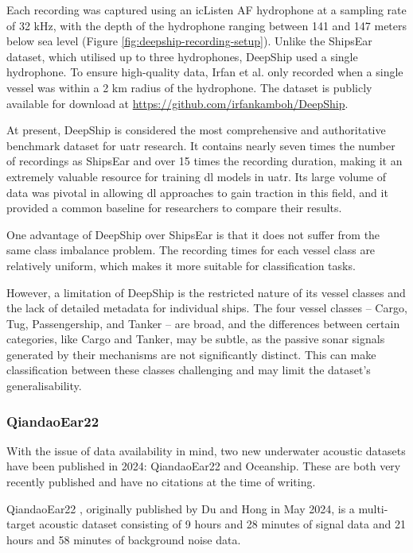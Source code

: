 Each recording was captured using an icListen AF hydrophone at a sampling rate of 32 kHz, with the depth of the hydrophone ranging between 141 and 147 meters below sea level (Figure \ref{fig:deepship-recording-setup}). Unlike the ShipsEar dataset, which utilised up to three hydrophones, DeepShip used a single hydrophone. To ensure high-quality data, Irfan et al. only recorded when a single vessel was within a 2 km radius of the hydrophone. The dataset is publicly available for download at \url{https://github.com/irfankamboh/DeepShip}.

At present, DeepShip is considered the most comprehensive and authoritative benchmark dataset for \acrshort{uatr} research. It contains nearly seven times the number of recordings as ShipsEar and over 15 times the recording duration, making it an extremely valuable resource for training \acrlong{dl} models in \acrshort{uatr}. Its large volume of data was pivotal in allowing \acrlong{dl} approaches to gain traction in this field, and it provided a common baseline for researchers to compare their results.

One advantage of DeepShip over ShipsEar is that it does not suffer from the same class imbalance problem. The recording times for each vessel class are relatively uniform, which makes it more suitable for classification tasks.

However, a limitation of DeepShip is the restricted nature of its vessel classes and the lack of detailed metadata for individual ships. The four vessel classes -- Cargo, Tug, Passengership, and Tanker -- are broad, and the differences between certain categories, like Cargo and Tanker, may be subtle, as the passive sonar signals generated by their mechanisms are not significantly distinct. This can make classification between these classes challenging and may limit the dataset's generalisability.

\subsubsection{QiandaoEar22}\label{subsubsec:qiandaoear22}

With the issue of data availability in mind, two new underwater acoustic datasets have been published in 2024: QiandaoEar22 and Oceanship. These are both very recently published and have no citations at the time of writing.

QiandaoEar22 \cite{du_qiandaoear22_2024, duQiandaoEar22HighqualityNoise2024}, originally published by Du and Hong in May 2024, is a multi-target acoustic dataset consisting of 9 hours and 28 minutes of signal data and 21 hours and 58 minutes of background noise data.

